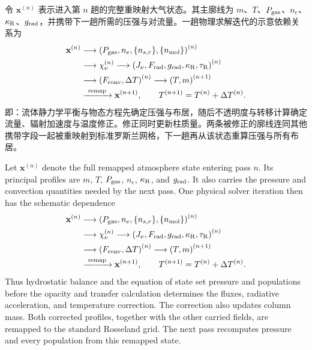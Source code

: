 令 $\mathbf{x}^{(n)}$ 表示进入第 $n$ 趟的完整重映射大气状态。其主廓线为 $m$、$T$、$P_{\rm gas}$、$n_e$、$\kappa_{\rm R}$、$g_{\rm rad}$，并携带下一趟所需的压强与对流量。一趟物理求解迭代的示意依赖关系为
\begin{equation}
\begin{aligned}
\mathbf{x}^{(n)}
&\longrightarrow
\left(P_{\rm gas},n_e,\{n_{s,r}\},\{n_{\rm mol}\}\right)^{(n)} \\
&\longrightarrow
\chi_\nu^{(n)} \longrightarrow
\left(J_\nu,F_{\rm rad},g_{\rm rad},\kappa_{\rm R},\tau_{\rm R}\right)^{(n)} \\
&\longrightarrow \left(F_{\rm conv},\Delta T\right)^{(n)}
\longrightarrow \left(T,m\right)^{(n+1)} \\
&\xrightarrow{\ \rm remap\ } \mathbf{x}^{(n+1)},
\qquad T^{(n+1)}=T^{(n)}+\Delta T^{(n)} .
\end{aligned}
\end{equation}
\noindent 即：流体静力学平衡与物态方程先确定压强与布居，随后不透明度与转移计算确定流量、辐射加速度与温度修正。修正同时更新柱质量。两条被修正的廓线连同其他携带字段一起被重映射到标准罗斯兰网格，下一趟再从该状态重算压强与所有布居。

\begin{EN}
Let $\mathbf{x}^{(n)}$ denote the full remapped atmosphere state
entering pass $n$. Its principal profiles are $m$, $T$, $P_{\rm gas}$, $n_e$,
$\kappa_{\rm R}$, and $g_{\rm rad}$. It also carries the pressure and convection
quantities needed by the next pass. One physical solver iteration then has the
schematic dependence
\begin{equation}
\begin{aligned}
\mathbf{x}^{(n)}
&\longrightarrow
\left(P_{\rm gas},n_e,\{n_{s,r}\},\{n_{\rm mol}\}\right)^{(n)} \\
&\longrightarrow
\chi_\nu^{(n)} \longrightarrow
\left(J_\nu,F_{\rm rad},g_{\rm rad},\kappa_{\rm R},\tau_{\rm R}\right)^{(n)} \\
&\longrightarrow \left(F_{\rm conv},\Delta T\right)^{(n)}
\longrightarrow \left(T,m\right)^{(n+1)} \\
&\xrightarrow{\ \rm remap\ } \mathbf{x}^{(n+1)},
\qquad T^{(n+1)}=T^{(n)}+\Delta T^{(n)} .
\end{aligned}
\end{equation}
\noindent Thus hydrostatic balance and the equation of state set pressure and
populations before the opacity and transfer calculation determines the fluxes,
radiative acceleration, and temperature correction. The correction also
updates column mass. Both corrected profiles, together with the other carried
fields, are remapped to the standard Rosseland grid. The next pass recomputes
pressure and every population from this remapped state.
\end{EN}

